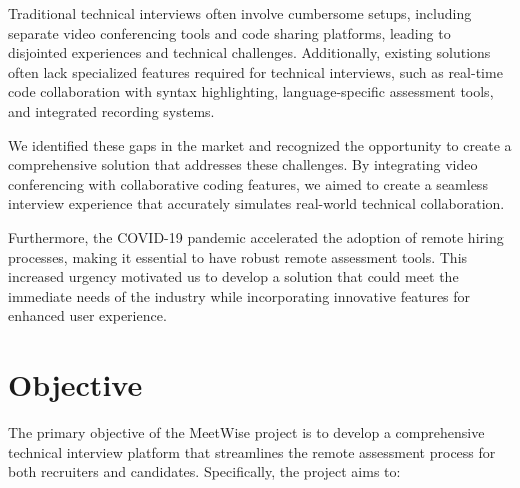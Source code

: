 \documentclass[12pt,a4paper]{report}
\begin{document}
Traditional technical interviews often involve cumbersome setups, including separate video conferencing tools and code sharing platforms, leading to disjointed experiences and technical challenges. Additionally, existing solutions often lack specialized features required for technical interviews, such as real-time code collaboration with syntax highlighting, language-specific assessment tools, and integrated recording systems.

We identified these gaps in the market and recognized the opportunity to create a comprehensive solution that addresses these challenges. By integrating video conferencing with collaborative coding features, we aimed to create a seamless interview experience that accurately simulates real-world technical collaboration.

Furthermore, the COVID-19 pandemic accelerated the adoption of remote hiring processes, making it essential to have robust remote assessment tools. This increased urgency motivated us to develop a solution that could meet the immediate needs of the industry while incorporating innovative features for enhanced user experience.

\chapter{Objective}
The primary objective of the MeetWise project is to develop a comprehensive technical interview platform that streamlines the remote assessment process for both recruiters and candidates. Specifically, the project aims to:
\end{document}
